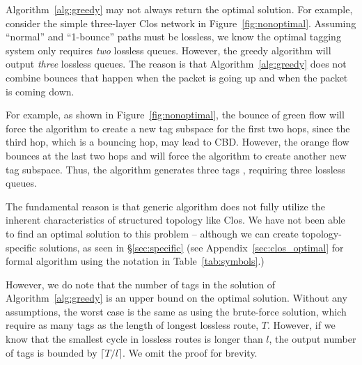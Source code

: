 Algorithm~\ref{alg:greedy} may not always return the optimal solution. For example,
consider the simple three-layer Clos network in Figure~\ref{fig:nonoptimal}.
Assuming ``normal'' and ``1-bounce'' paths must be lossless,
we know the optimal tagging system only requires {\em two} lossless queues. However, the
greedy algorithm will output {\em three} lossless queues. The reason is that
Algorithm~\ref{alg:greedy} does not combine bounces that happen when the packet is going up
and when the packet is coming down.

For example, as shown in Figure~\ref{fig:nonoptimal}, the bounce of green flow
will force the algorithm to create a new tag subspace for the first two hops,
since the third hop, which is a bouncing hop, may lead to CBD.  However, the
orange flow bounces at the last two hops and will force the algorithm to create
another new tag subspace. Thus, the algorithm generates three tags , requiring
three lossless queues.

The fundamental reason is that generic algorithm does not fully utilize the
inherent characteristics of structured topology like Clos. We have not been able
to find an optimal solution to this problem -- although we can create
topology-specific solutions, as seen in \S\ref{sec:specific} (see
Appendix~\ref{sec:clos_optimal} for formal algorithm using the notation in
Table~\ref{tab:symbols}.)

However, we do note that the number of tags in the solution of
Algorithm~\ref{alg:greedy} is an upper bound on the optimal solution.  Without
any assumptions, the worst case is the same as using the brute-force solution,
which require as many tags as the length of longest lossless route, $T$.
However, if we know that the smallest cycle in lossless routes is longer than
$l$, the output number of tags is bounded by $\lceil T/l \rceil$. We omit the
proof for brevity.

